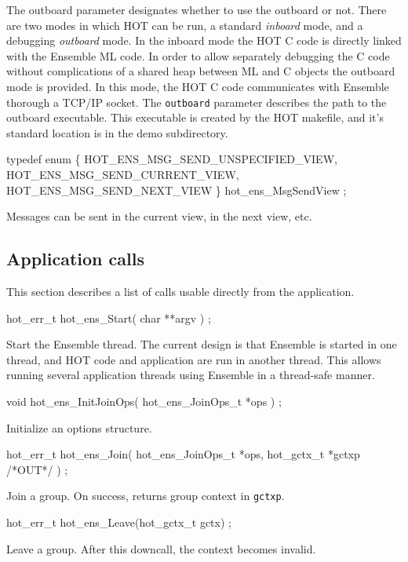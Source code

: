 The outboard parameter designates whether to use the outboard or not. 
There are two modes in which HOT can be run, a standard {\it inboard} mode,
and a debugging {\it outboard} mode. In the inboard mode the HOT C
code is directly linked with the Ensemble ML code. In order to allow
separately debugging the C code without complications of a shared heap
between ML and C objects the outboard mode is provided. In this mode,
the HOT C code communicates with Ensemble thorough a TCP/IP
socket. The {\tt outboard} parameter describes the path to the
outboard executable. This executable is created by the HOT makefile,
and it's standard location is in the demo subdirectory.

\begin{codebox}
typedef enum \{
  HOT_ENS_MSG_SEND_UNSPECIFIED_VIEW,
  HOT_ENS_MSG_SEND_CURRENT_VIEW,
  HOT_ENS_MSG_SEND_NEXT_VIEW
\} hot_ens_MsgSendView ;
\end{codebox}
Messages can be sent in the current view, in the next view, etc. 

\subsection{Application calls}
This section describes a list of calls usable directly from the
application. 

\begin{codebox}
hot_err_t hot_ens_Start(
  char **argv
) ;
\end{codebox}
Start the Ensemble thread. The current design is that Ensemble is
started in one thread, and HOT code and application are run in another
thread. This allows running several application threads using Ensemble
in a thread-safe manner. 

\begin{codebox}
void hot_ens_InitJoinOps(
  hot_ens_JoinOps_t *ops
) ;
\end{codebox}
Initialize an options structure. 

\begin{codebox}
hot_err_t hot_ens_Join(
  hot_ens_JoinOps_t *ops, 
  hot_gctx_t *gctxp /*OUT*/
) ;
\end{codebox}
Join a group.  On success, returns group context in {\tt *gctxp}.

\begin{codebox}
hot_err_t hot_ens_Leave(hot_gctx_t gctx) ;
\end{codebox}
Leave a group.  After this downcall, the context becomes invalid.

